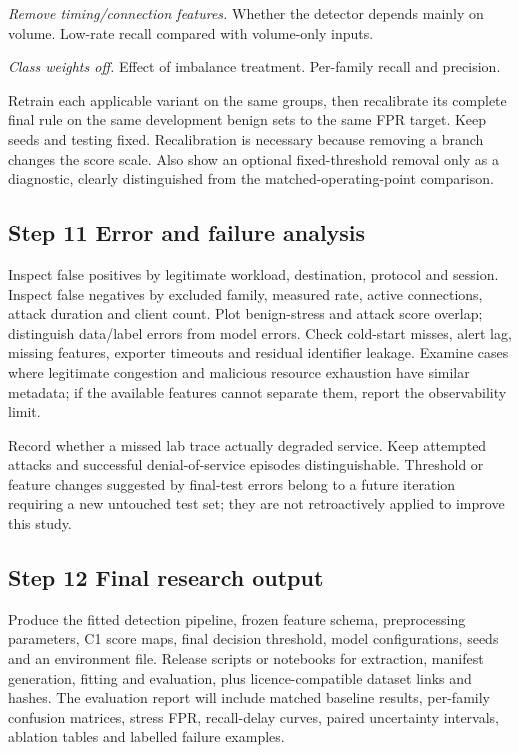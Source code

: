 \documentclass[conference]{IEEEtran}
\begin{document}
\noindent\textit{Remove timing/connection features.} Whether the detector depends mainly on volume. Low-rate recall compared with volume-only inputs.

\noindent\textit{Class weights off.} Effect of imbalance treatment. Per-family recall and precision.

Retrain each applicable variant on the same groups, then recalibrate its complete final rule on the same development benign sets to the same FPR target. Keep seeds and testing fixed. Recalibration is necessary because removing a branch changes the score scale. Also show an optional fixed-threshold removal only as a diagnostic, clearly distinguished from the matched-operating-point comparison.

\subsection{Step 11 Error and failure analysis}
Inspect false positives by legitimate workload, destination, protocol and session. Inspect false negatives by excluded family, measured rate, active connections, attack duration and client count. Plot benign-stress and attack score overlap; distinguish data/label errors from model errors. Check cold-start misses, alert lag, missing features, exporter timeouts and residual identifier leakage. Examine cases where legitimate congestion and malicious resource exhaustion have similar metadata; if the available features cannot separate them, report the observability limit.

Record whether a missed lab trace actually degraded service. Keep attempted attacks and successful denial-of-service episodes distinguishable. Threshold or feature changes suggested by final-test errors belong to a future iteration requiring a new untouched test set; they are not retroactively applied to improve this study.

\subsection{Step 12 Final research output}
Produce the fitted detection pipeline, frozen feature schema, preprocessing parameters, C1 score maps, final decision threshold, model configurations, seeds and an environment file. Release scripts or notebooks for extraction, manifest generation, fitting and evaluation, plus licence-compatible dataset links and hashes. The evaluation report will include matched baseline results, per-family confusion matrices, stress FPR, recall-delay curves, paired uncertainty intervals, ablation tables and labelled failure examples.
\end{document}
